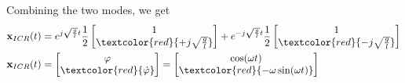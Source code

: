 \begin{examplesection}
    Combining the two modes, we get
    \begin{align*}
        \mathbf{x}_{ICR}(t) & = e^{j\sqrt{\frac{g}{l}}t}\frac{1}{2}
        \begin{bmatrix}
            1 \\
            \textcolor{red}{+j \sqrt{\frac{g}{l}}}
        \end{bmatrix} + e^{-j\sqrt{\frac{g}{l}}t}\frac{1}{2}
        \begin{bmatrix}
            1 \\
            \textcolor{red}{-j \sqrt{\frac{g}{l}}}
        \end{bmatrix}                      \\
        \mathbf{x}_{ICR}(t) & = \begin{bmatrix}
                                    \varphi \\
                                    \textcolor{red}{\dot{\varphi}}
                                \end{bmatrix}
        = \begin{bmatrix}
              \cos(\omega t) \\
              \textcolor{red}{-\omega\sin(\omega t)}
          \end{bmatrix}
    \end{align*}
\end{examplesection}
